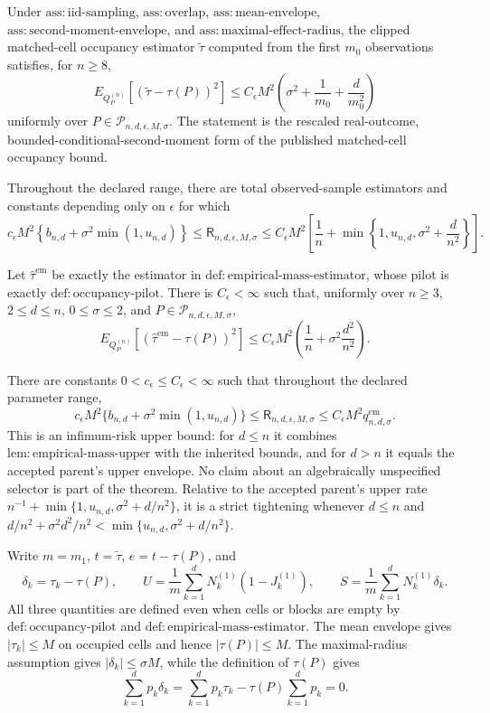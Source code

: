 Under \(\mathrm{ass:iid\text{-}sampling}\), \(\mathrm{ass:overlap}\), \(\mathrm{ass:mean\text{-}envelope}\), \(\mathrm{ass:second\text{-}moment\text{-}envelope}\), and \(\mathrm{ass:maximal\text{-}effect\text{-}radius}\), the clipped matched-cell occupancy estimator \(\widetilde\tau\) computed from the first \(m_0\) observations satisfies, for \(n\geq 8\),
\[
 E_{Q_P^{(n)}}\!\left[(\widetilde\tau-\tau(P))^2\right]
 \leq C_{\epsilon}M^2\left(\sigma^2+\frac1{m_0}+\frac d{m_0^2}\right)
\]
uniformly over \(P\in\mathcal P_{n,d,\epsilon,M,\sigma}\).  The statement is the rescaled real-outcome, bounded-conditional-second-moment form of the published matched-cell occupancy bound.

Throughout the declared range, there are total observed-sample estimators and constants depending only on \(\epsilon\) for which
\[
 c_{\epsilon}M^2\left\{b_{n,d}+\sigma^2\min(1,u_{n,d})\right\}
 \leq \mathsf R_{n,d,\epsilon,M,\sigma}
 \leq C_{\epsilon}M^2\left[\frac1n+\min\left\{1,u_{n,d},\sigma^2+\frac d{n^2}\right\}\right].
\]

Let \(\widehat\tau^{\mathrm{em}}\) be exactly the estimator in \(\mathrm{def:empirical\text{-}mass\text{-}estimator}\), whose pilot is exactly \(\mathrm{def:occupancy\text{-}pilot}\). There is \(C_{\epsilon}<\infty\) such that, uniformly over \(n\ge3\), \(2\le d\le n\), \(0\le\sigma\le2\), and \(P\in\mathcal P_{n,d,\epsilon,M,\sigma}\),
\[
 E_{Q_P^{(n)}}[(\widehat\tau^{\mathrm{em}}-\tau(P))^2]
 \le C_{\epsilon}M^2\left(\frac1n+\sigma^2\frac{d^2}{n^2}\right).
\]

There are constants \(0<c_{\epsilon}\le C_{\epsilon}<\infty\) such that throughout the declared parameter range,
\[
 c_{\epsilon}M^2\{b_{n,d}+\sigma^2\min(1,u_{n,d})\}
 \le\mathsf R_{n,d,\epsilon,M,\sigma}
 \le C_{\epsilon}M^2q_{n,d,\sigma}^{\mathrm{em}}.
\]
This is an infimum-risk upper bound: for \(d\le n\) it combines \(\mathrm{lem:empirical\text{-}mass\text{-}upper}\) with the inherited bounds, and for \(d>n\) it equals the accepted parent's upper envelope. No claim about an algebraically unspecified selector is part of the theorem. Relative to the accepted parent's upper rate \(n^{-1}+\min\{1,u_{n,d},\sigma^2+d/n^2\}\), it is a strict tightening whenever \(d\le n\) and \(d/n^2+\sigma^2d^2/n^2<\min\{u_{n,d},\sigma^2+d/n^2\}\).

Write \(m=m_1\), \(t=\widetilde\tau\), \(e=t-\tau(P)\), and
\[
 \delta_k=\tau_k-\tau(P),\qquad
 U=\frac1m\sum_{k=1}^dN_k^{(1)}(1-J_k^{(1)}),\qquad
 S=\frac1m\sum_{k=1}^dN_k^{(1)}\delta_k.
\]
All three quantities are defined even when cells or blocks are empty by \(\mathrm{def:occupancy\text{-}pilot}\) and \(\mathrm{def:empirical\text{-}mass\text{-}estimator}\).  The mean envelope gives \(|\tau_k|\leq M\) on occupied cells and hence \(|\tau(P)|\leq M\).  The maximal-radius assumption gives \(|\delta_k|\leq\sigma M\), while the definition of \(\tau(P)\) gives
\[
 \sum_{k=1}^dp_k\delta_k
 =\sum_{k=1}^dp_k\tau_k-\tau(P)\sum_{k=1}^dp_k=0.
\]

